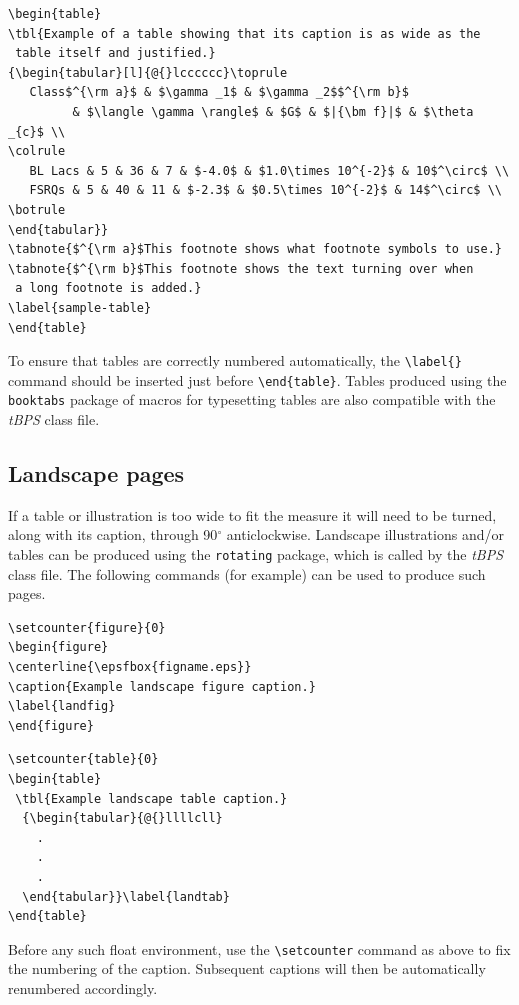 \documentclass{tBPS2e}
\theoremstyle{plain}
\theoremstyle{definition}
\theoremstyle{remark}
\begin{document}
\begin{verbatim}
\begin{table}
\tbl{Example of a table showing that its caption is as wide as the
 table itself and justified.}
{\begin{tabular}[l]{@{}lcccccc}\toprule
   Class$^{\rm a}$ & $\gamma _1$ & $\gamma _2$$^{\rm b}$
         & $\langle \gamma \rangle$ & $G$ & $|{\bm f}|$ & $\theta _{c}$ \\
\colrule
   BL Lacs & 5 & 36 & 7 & $-4.0$ & $1.0\times 10^{-2}$ & 10$^\circ$ \\
   FSRQs & 5 & 40 & 11 & $-2.3$ & $0.5\times 10^{-2}$ & 14$^\circ$ \\
\botrule
\end{tabular}}
\tabnote{$^{\rm a}$This footnote shows what footnote symbols to use.}
\tabnote{$^{\rm b}$This footnote shows the text turning over when
 a long footnote is added.}
\label{sample-table}
\end{table}
\end{verbatim}

To ensure that tables are correctly numbered automatically, the \verb"\label{}" command should be inserted just before \verb"\end{table}".
Tables produced using the \texttt{booktabs} package of macros for typesetting tables are also compatible with the \textit{tBPS} class file.


\subsection{Landscape pages}\label{landscape}

If a table or illustration is too wide to fit the measure it will need to be turned, along with its caption, through 90$^{\circ}$ anticlockwise.
Landscape illustrations and/or tables can be produced using the \verb"rotating" package, which is called by the \textit{tBPS} class file.
The following commands (for example) can be used to produce such pages.
\begin{verbatim}
\setcounter{figure}{0}
\begin{figure}
\centerline{\epsfbox{figname.eps}}
\caption{Example landscape figure caption.}
\label{landfig}
\end{figure}
\end{verbatim}

\begin{verbatim}
\setcounter{table}{0}
\begin{table}
 \tbl{Example landscape table caption.}
  {\begin{tabular}{@{}llllcll}
    .
    .
    .
  \end{tabular}}\label{landtab}
\end{table}
\end{verbatim}
Before any such float environment, use the \verb"\setcounter" command as above to fix the numbering of the caption. Subsequent captions will then be automatically renumbered accordingly.
\end{document}
